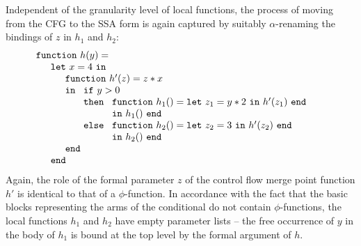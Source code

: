 Independent of the granularity level of local functions, the process
of moving from the CFG to the SSA form is again captured by suitably
$\alpha$-renaming the bindings of $z$ in $h_1$ and $h_2$:
\begin{equation}
\label{DirectStyleCode3}
\begin{array}{l}
\mathtt{function}\ h (y) =\\
\quad
  \begin{array}{l}
    \mathtt{let}\ x=4\ \mathtt{in} \\
    \quad \begin{array}{l}
            \mathtt{function}\ h' (z) = z*x \\
            \mathtt{in}\
                \begin{array}[t]{l}
                  \mathtt{if}\ y>0\\
                  \mathtt{then}\ 
                     \begin{array}[t]{l}
                        \mathtt{function}\ h_1 () = \mathtt{let}\
                              z_1 = y*2\ \mathtt{in}\ h'(z_1)\ \mathtt{end}\\
                        \mathtt{in}\ h_1()\ \mathtt{end}
                     \end{array}\\
                  \mathtt{else}\ 
                     \begin{array}[t]{l}
                        \mathtt{function}\ h_2 () = \mathtt{let}\
                              z_2 = 3\ \mathtt{in}\ h'(z_2)\ \mathtt{end}\\
                        \mathtt{in}\ h_2()\ \mathtt{end}
                     \end{array}
                \end{array}\\
            \mathtt{end}
          \end{array} \\
    \mathtt{end}
  \end{array}
\end{array}
\end{equation}
Again, the role of the formal parameter $z$ of the control flow merge
point function $h'$ is identical to that of a $\phi$-function. In
accordance with the fact that the basic blocks representing the arms
of the conditional do not contain $\phi$-functions, the local
functions $h_1$ and $h_2$ have empty parameter lists -- the free
occurrence of $y$ in the body of $h_1$ is bound at the top level by
the formal argument of $h$.

